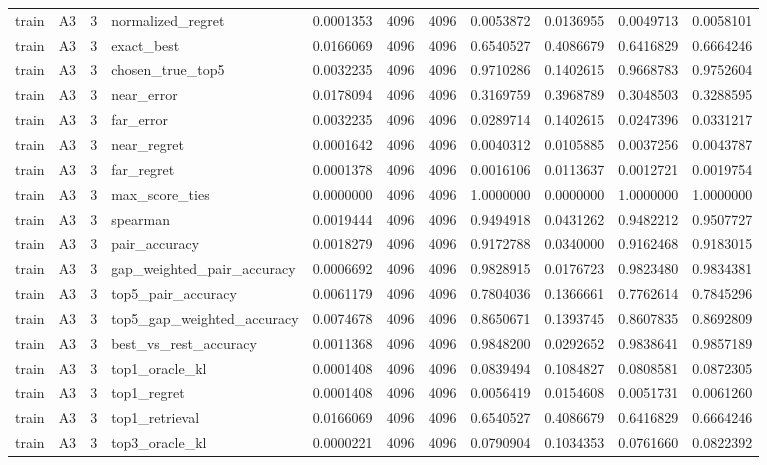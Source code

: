 \begin{tabular}{llrlrrrrrrr}
train & A3 & 3 & normalized_regret & 0.0001353 & 4096 & 4096 & 0.0053872 & 0.0136955 & 0.0049713 & 0.0058101 \\
train & A3 & 3 & exact_best & 0.0166069 & 4096 & 4096 & 0.6540527 & 0.4086679 & 0.6416829 & 0.6664246 \\
train & A3 & 3 & chosen_true_top5 & 0.0032235 & 4096 & 4096 & 0.9710286 & 0.1402615 & 0.9668783 & 0.9752604 \\
train & A3 & 3 & near_error & 0.0178094 & 4096 & 4096 & 0.3169759 & 0.3968789 & 0.3048503 & 0.3288595 \\
train & A3 & 3 & far_error & 0.0032235 & 4096 & 4096 & 0.0289714 & 0.1402615 & 0.0247396 & 0.0331217 \\
train & A3 & 3 & near_regret & 0.0001642 & 4096 & 4096 & 0.0040312 & 0.0105885 & 0.0037256 & 0.0043787 \\
train & A3 & 3 & far_regret & 0.0001378 & 4096 & 4096 & 0.0016106 & 0.0113637 & 0.0012721 & 0.0019754 \\
train & A3 & 3 & max_score_ties & 0.0000000 & 4096 & 4096 & 1.0000000 & 0.0000000 & 1.0000000 & 1.0000000 \\
train & A3 & 3 & spearman & 0.0019444 & 4096 & 4096 & 0.9494918 & 0.0431262 & 0.9482212 & 0.9507727 \\
train & A3 & 3 & pair_accuracy & 0.0018279 & 4096 & 4096 & 0.9172788 & 0.0340000 & 0.9162468 & 0.9183015 \\
train & A3 & 3 & gap_weighted_pair_accuracy & 0.0006692 & 4096 & 4096 & 0.9828915 & 0.0176723 & 0.9823480 & 0.9834381 \\
train & A3 & 3 & top5_pair_accuracy & 0.0061179 & 4096 & 4096 & 0.7804036 & 0.1366661 & 0.7762614 & 0.7845296 \\
train & A3 & 3 & top5_gap_weighted_accuracy & 0.0074678 & 4096 & 4096 & 0.8650671 & 0.1393745 & 0.8607835 & 0.8692809 \\
train & A3 & 3 & best_vs_rest_accuracy & 0.0011368 & 4096 & 4096 & 0.9848200 & 0.0292652 & 0.9838641 & 0.9857189 \\
train & A3 & 3 & top1_oracle_kl & 0.0001408 & 4096 & 4096 & 0.0839494 & 0.1084827 & 0.0808581 & 0.0872305 \\
train & A3 & 3 & top1_regret & 0.0001408 & 4096 & 4096 & 0.0056419 & 0.0154608 & 0.0051731 & 0.0061260 \\
train & A3 & 3 & top1_retrieval & 0.0166069 & 4096 & 4096 & 0.6540527 & 0.4086679 & 0.6416829 & 0.6664246 \\
train & A3 & 3 & top3_oracle_kl & 0.0000221 & 4096 & 4096 & 0.0790904 & 0.1034353 & 0.0761660 & 0.0822392 \\

\end{tabular}
